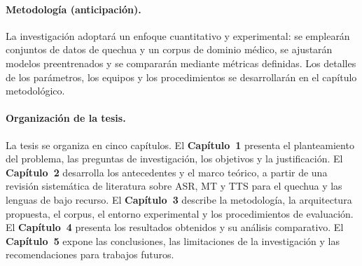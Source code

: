 \paragraph{Metodología (anticipación).}
La investigación adoptará un enfoque cuantitativo y experimental: se emplearán
conjuntos de datos de quechua y un corpus de dominio médico, se ajustarán
modelos preentrenados y se compararán mediante métricas definidas. Los detalles
de los parámetros, los equipos y los procedimientos se desarrollarán en el
capítulo metodológico.

\paragraph{Organización de la tesis.}
La tesis se organiza en cinco capítulos. El \textbf{Capítulo~1} presenta el
planteamiento del problema, las preguntas de investigación, los objetivos y la
justificación. El \textbf{Capítulo~2} desarrolla los antecedentes y el marco
teórico, a partir de una revisión sistemática de literatura sobre ASR, MT y TTS
para el quechua y las lenguas de bajo recurso. El \textbf{Capítulo~3} describe la
metodología, la arquitectura propuesta, el corpus, el entorno experimental y los
procedimientos de evaluación. El \textbf{Capítulo~4} presenta los resultados
obtenidos y su análisis comparativo. El \textbf{Capítulo~5} expone las
conclusiones, las limitaciones de la investigación y las recomendaciones para
trabajos futuros.
